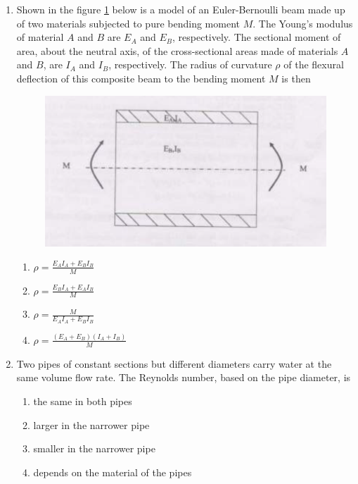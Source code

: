 \documentclass[journal]{IEEEtran}
\begin{document}
\begin{enumerate}
	\item Shown in the figure \ref{25} below is a model of an Euler-Bernoulli beam made up of two materials subjected to pure bending moment $M$. The Young's modulus of material $A$ and $B$ are $E_A$ and $E_B$, respectively. The sectional moment of area, about the neutral axis, of the cross-sectional areas made of materials $A$ and $B$, are $I_A$ and $I_B$, respectively. The radius of curvature $\rho$ of the flexural deflection of this composite beam to the bending moment $M$ is then

		\begin{figure}[H]
			\centering
			\includegraphics[width=\textwidth]{figs/25.png}
			\caption{}
			\label{25}
		\end{figure}


		\begin{enumerate}
    			\item $ \rho = \frac{E_A I_A + E_B I_B}{M} $
   			\item $ \rho = \frac{E_B I_A + E_A I_B}{M} $
  			\item $ \rho = \frac{M}{E_A I_A + E_B I_B} $
  			\item $ \rho = \frac{(E_A + E_B)(I_A + I_B)}{M} $
		\end{enumerate}


	\item Two pipes of constant sections but different diameters carry water at the same volume flow rate. The Reynolds number, based on the pipe diameter, is
		\begin{enumerate}
    			\item the same in both pipes
    			\item larger in the narrower pipe
    			\item smaller in the narrower pipe
    			\item depends on the material of the pipes
		\end{enumerate}


\end{enumerate}
\end{document}
